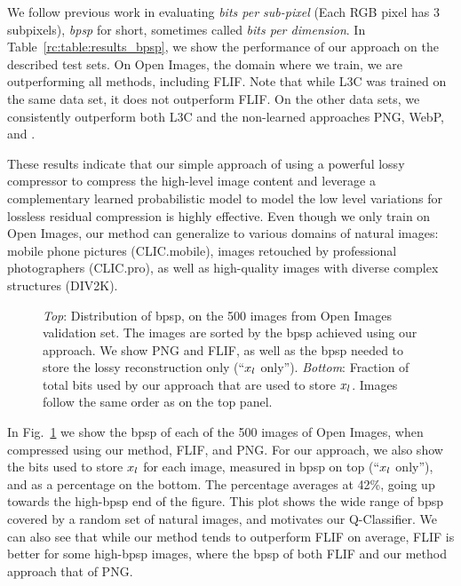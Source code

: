 We follow previous work in evaluating \emph{bits per sub-pixel} (Each RGB pixel has 3 subpixels), \emph{bpsp} for short, sometimes called \emph{bits per dimension}.
In Table~\ref{rc:table:results_bpsp}, we show the performance of our approach on the described test sets. On Open Images, the domain where we train, we are outperforming all methods, including FLIF. Note that while L3C was trained on the same data set, it does not outperform FLIF. 
On the other data sets, we consistently outperform both L3C and the non-learned approaches PNG, WebP, and \jpegk.

These results indicate that our simple approach of using a powerful lossy compressor to compress the high-level image content and leverage a complementary learned probabilistic model to model the low level variations for lossless residual compression is highly effective. 
Even though we only train on Open Images, our method can generalize to various domains of natural images: mobile phone pictures (CLIC.mobile), images retouched by professional photographers (CLIC.pro), as well as high-quality images with diverse complex structures (DIV2K).


\begin{figure}[hb!]
%
\caption{\label{rc:fig:bpp_dist}
\emph{Top}: Distribution of bpsp, on the 500 images from Open Images validation set. The images are sorted by the bpsp achieved using our approach. We show PNG and FLIF, as well as the bpsp needed to store the lossy reconstruction only (``$x_l$ only''). \emph{Bottom}: Fraction of total bits used by our approach that are used to store $x_l$. Images follow the same order as on the top panel.}
\end{figure}


In Fig.~\ref{rc:fig:bpp_dist} we show the bpsp of each of the 500 images of Open Images, when compressed using our method, FLIF, and PNG. For our approach, we also show the bits used to store $x_l$ for each image, measured in bpsp on top (``$x_l$ only''), and as a percentage on the bottom. The percentage averages at 42\%, going up towards the high-bpsp end of the figure.
This plot shows the wide range of bpsp covered by a random set of natural images, and motivates our Q-Classifier. We can also see that while our method tends to outperform FLIF on average, FLIF is better for some high-bpsp images, where the bpsp of both FLIF and our method approach that of PNG.


